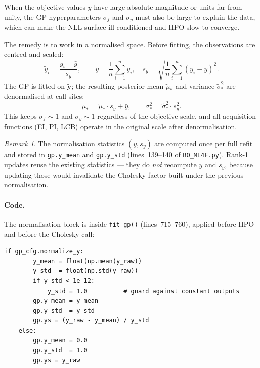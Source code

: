 \documentclass[11pt,a4paper]{article}
\newcommand{\by}{\bm{y}}
\theoremstyle{remark}
\newtheorem{remark}{Remark}
\newcommand{\codefile}[1]{\texttt{#1}}
\newcommand{\coderange}[2]{lines~#1--#2}
\newcommand{\codefn}[1]{\texttt{#1()}}
\begin{document}
When the objective values $y$ have large absolute magnitude or units far from
unity, the GP hyperparameters $\sigma_f$ and $\sigma_y$ must also be large to
explain the data, which can make the NLL surface ill-conditioned and HPO slow
to converge.

The remedy is to work in a normalised space.  Before fitting, the observations
are centred and scaled:
\begin{equation}
  \label{eq:normalise}
  \tilde{y}_i = \frac{y_i - \bar{y}}{s_y}, \qquad
  \bar{y} = \frac{1}{n}\sum_{i=1}^n y_i, \quad
  s_y = \sqrt{\frac{1}{n}\sum_{i=1}^n (y_i - \bar{y})^2}.
\end{equation}
The GP is fitted on $\tilde{\by}$; the resulting posterior mean
$\tilde\mu_*$ and variance $\tilde\sigma_*^2$ are denormalised at call sites:
\begin{equation}
  \label{eq:denormalise}
  \mu_* = \tilde\mu_* \cdot s_y + \bar{y},
  \qquad
  \sigma_*^2 = \tilde\sigma_*^2 \cdot s_y^2.
\end{equation}
This keeps $\sigma_f \sim 1$ and $\sigma_y \sim 1$ regardless of the
objective scale, and all acquisition functions (EI, PI, LCB) operate in the
original scale after denormalisation.

\begin{remark}
The normalisation statistics $(\bar{y}, s_y)$ are computed once per full refit
and stored in \texttt{gp.y\_mean} and \texttt{gp.y\_std}
(\coderange{139}{140} of \codefile{BO\_ML4F.py}).  Rank-1 updates reuse the
existing statistics --- they do \emph{not} recompute $\bar{y}$ and $s_y$,
because updating those would invalidate the Cholesky factor built under the
previous normalisation.
\end{remark}

\paragraph{Code.}
The normalisation block is inside \codefn{fit\_gp} (\coderange{715}{760}),
applied before HPO and before the Cholesky call:

\begin{lstlisting}[firstnumber=726, caption=Output normalisation in \codefn{fit\_gp}]
    if gp_cfg.normalize_y:
        y_mean = float(np.mean(y_raw))
        y_std  = float(np.std(y_raw))
        if y_std < 1e-12:
            y_std = 1.0          # guard against constant outputs
        gp.y_mean = y_mean
        gp.y_std  = y_std
        gp.ys = (y_raw - y_mean) / y_std
    else:
        gp.y_mean = 0.0
        gp.y_std  = 1.0
        gp.ys = y_raw
\end{lstlisting}
\end{document}

